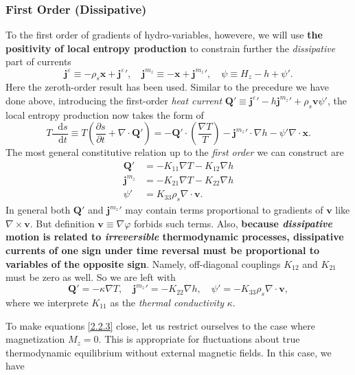 \documentclass[10pt,nofootinbib]{revtex4}
\newcommand*\dd{\mathop{}\!\mathrm{d}}
\begin{document}
		\subsubsection{First Order (Dissipative)}
			To the first order of gradients of hydro-variables, howevere, we will use {\bf the positivity of local entropy production} to constrain further the \emph{dissipative} part of currents
			\begin{equation}\label{2.2.1}
				\bm{j}^\varepsilon\equiv-\rho_s\bm{x}+{\bm{j}^\varepsilon}',\quad\bm{j}^{m_z}\equiv-\bm{x}+{\bm{j}^{m_z}}',\quad \psi\equiv H_z-h+\psi'.
			\end{equation}
			Here the zeroth-order result has been used.	Similar to the precedure we have done above, introducing the first-order \emph{heat current} $\bm{Q'}\equiv{\bm{j}^\varepsilon}'-h{\bm{j}^{m_z}}'+\rho_s\bm{v}\psi'$, the local entropy production now takes the form of
			\begin{equation}\label{2.2.2}
				T\dfrac{\dd s}{\dd t}\equiv T \left(\dfrac{\partial s}{\partial t}+\nabla\cdot\bm{Q'}\right)=-\bm{Q'}\cdot\left(\dfrac{\nabla T}{T}\right)-{\bm{j}^{m_z}}'\cdot\nabla h-\psi'\nabla\cdot\bm{x}.
			\end{equation}
			The most general constitutive relation up to the \emph{first order} we can construct are
			\begin{align*}
				\bm{Q}'&=-K_{11}\nabla T-K_{12}\nabla h\\
				{\bm{j}^{m_z}}&=-K_{21}\nabla T-K_{22}\nabla h\\
				\psi'&=K_{33}\rho_s\nabla\cdot\bm{v}.
			\end{align*}
			In general both $\bm{Q}'$ and ${\bm{j}^{m_z}}'$ may contain terms proportional to gradients of $\bm{v}$ like $\nabla\times\bm{v}$. But definition $\bm{v}\equiv\nabla\varphi$ forbids such terms. Also, {\color{red}\bf because \emph{dissipative} motion is related to \emph{irreversible} thermodynamic processes, dissipative currents of one sign under time reversal must be proportional to variables of the opposite sign}. Namely, off-diagonal couplings $K_{12}$ and $K_{21}$ must be zero as well. So we are left with
			\begin{equation}\label{2.2.3}
				\bm{Q}'=-\kappa\nabla T,\quad {\bm{j}^{m_z}}'=-K_{22}\nabla h,\quad \psi'=-K_{33}\rho_s\nabla\cdot\bm{v},
			\end{equation}
			where we interprete $K_{11}$ as the \emph{thermal conductivity} $\kappa$.\par
			To make equations \eqref{2.2.3} close, let us restrict ourselves to the case where magnetization $M_z=0$. This is appropriate for fluctuations about true thermodynamic equilibrium without external magnetic fields. In this case, we have
\end{document}
